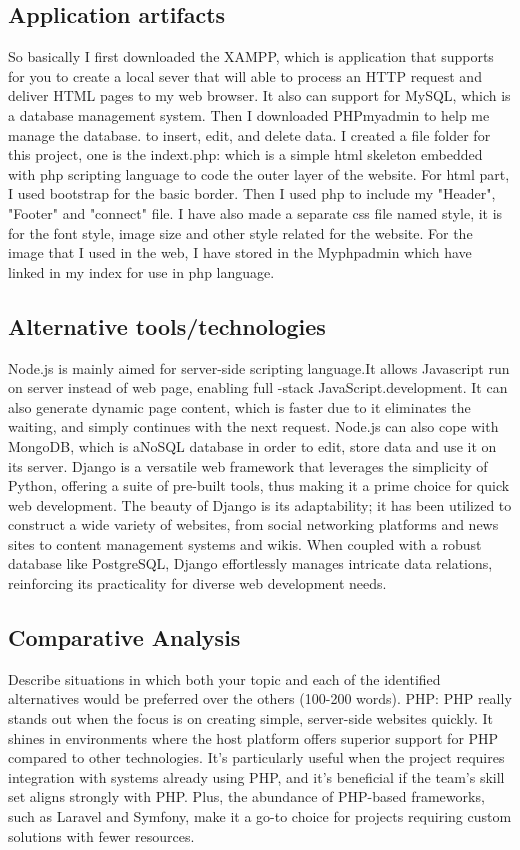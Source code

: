 \documentclass[a4paper, 11pt]{report}
\begin{document}
\subsection{Application artifacts}
	So basically I first downloaded the XAMPP, which is application that supports for you to create a local sever that will able to process an HTTP request and deliver HTML pages to my web browser. It also can support for MySQL, which is a database management system. Then I downloaded PHPmyadmin to help me manage the database. to insert, edit, and delete data. I created a file folder for this project, one is the indext.php: which is a simple html skeleton embedded with php scripting language to code the outer layer of the website. For html part, I used bootstrap for the basic border. Then I used php to include my "Header", "Footer" and "connect" file. I have also made a separate css file named style, it is for the font style, image size and other style related for the website. For the image that I used in the web, I have stored in the Myphpadmin which have linked in my index for use in php language.

\subsection{Alternative tools/technologies}

	Node.js is mainly aimed for server-side scripting language.It allows Javascript run on server instead of web page, enabling full -stack JavaScript.development. It can also generate dynamic page content, which is faster due to it eliminates the waiting, and simply continues with the next request. Node.js can also cope with MongoDB, which is aNoSQL database in order to edit, store data and use it on its server\cite{W32}.
	Django is a versatile web framework that leverages the simplicity of Python, offering a suite of pre-built tools, thus making it a prime choice for quick web development. The beauty of Django is its adaptability; it has been utilized to construct a wide variety of websites, from social networking platforms and news sites to content management systems and wikis. When coupled with a robust database like PostgreSQL, Django effortlessly manages intricate data relations, reinforcing its practicality for diverse web development needs\cite{Django}.
\subsection{Comparative Analysis}

Describe situations in which both your topic and each of the identified alternatives would be preferred over the others (100-200 words).
PHP: PHP really stands out when the focus is on creating simple, server-side websites quickly. It shines in environments where the host platform offers superior support for PHP compared to other technologies. It's particularly useful when the project requires integration with systems already using PHP, and it's beneficial if the team's skill set aligns strongly with PHP. Plus, the abundance of PHP-based frameworks, such as Laravel and Symfony, make it a go-to choice for projects requiring custom solutions with fewer resources.
\end{document}
